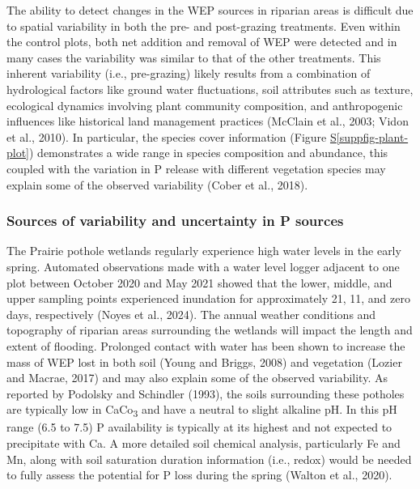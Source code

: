\documentclass[
]{agujournal2019}
\newcommand*\quartosuppfigref[1]{Figure \hyperref[#1]{S\ref{#1}}}
\begin{document}
The ability to detect changes in the WEP sources in riparian areas is
difficult due to spatial variability in both the pre- and post-grazing
treatments. Even within the control plots, both net addition and removal
of WEP were detected and in many cases the variability was similar to
that of the other treatments. This inherent variability (i.e.,
pre-grazing) likely results from a combination of hydrological factors
like ground water fluctuations, soil attributes such as texture,
ecological dynamics involving plant community composition, and
anthropogenic influences like historical land management practices
(McClain et al., 2003; Vidon et al., 2010). In particular, the species
cover information (\quartosuppfigref{suppfig-plant-plot}) demonstrates a
wide range in species composition and abundance, this coupled with the
variation in P release with different vegetation species may explain
some of the observed variability (Cober et al., 2018).

\subsubsection{Sources of variability and uncertainty in P
sources}\label{sources-of-variability-and-uncertainty-in-p-sources}

The Prairie pothole wetlands regularly experience high water levels in
the early spring. Automated observations made with a water level logger
adjacent to one plot between October 2020 and May 2021 showed that the
lower, middle, and upper sampling points experienced inundation for
approximately 21, 11, and zero days, respectively (Noyes et al., 2024).
The annual weather conditions and topography of riparian areas
surrounding the wetlands will impact the length and extent of flooding.
Prolonged contact with water has been shown to increase the mass of WEP
lost in both soil (Young and Briggs, 2008) and vegetation (Lozier and
Macrae, 2017) and may also explain some of the observed variability. As
reported by Podolsky and Schindler (1993), the soils surrounding these
potholes are typically low in CaCo\textsubscript{3} and have a neutral
to slight alkaline pH. In this pH range (6.5 to 7.5) P availability is
typically at its highest and not expected to precipitate with Ca. A more
detailed soil chemical analysis, particularly Fe and Mn, along with soil
saturation duration information (i.e., redox) would be needed to fully
assess the potential for P loss during the spring (Walton et al., 2020).
\end{document}
